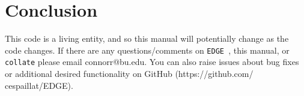 \documentclass{article}
\newcommand{\edge}{\texttt{EDGE }}
\begin{document}










\section{Conclusion}
 
This code is a living entity, and so this manual will potentially change as the code changes. If there are any questions/comments on \edge, this manual, or \texttt{collate} please email connorr@bu.edu. You can also raise issues about bug fixes or additional desired functionality on GitHub (https://github.com/ cespaillat/EDGE). 
\end{document}
